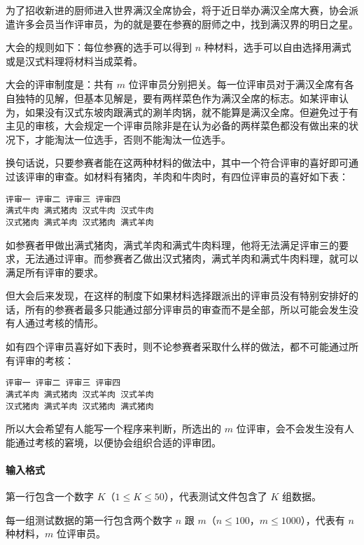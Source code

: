 \documentclass[]{article}
\let\oldparagraph\paragraph
\renewcommand{\paragraph}[1]{\oldparagraph{#1}\mbox{}}
\begin{document}
为了招收新进的厨师进入世界满汉全席协会，将于近日举办满汉全席大赛，协会派遣许多会员当作评审员，为的就是要在参赛的厨师之中，找到满汉界的明日之星。

大会的规则如下：每位参赛的选手可以得到 \(n\)
种材料，选手可以自由选择用满式或是汉式料理将材料当成菜肴。

大会的评审制度是：共有 \(m\)
位评审员分别把关。每一位评审员对于满汉全席有各自独特的见解，但基本见解是，要有两样菜色作为满汉全席的标志。如某评审认为，如果没有汉式东坡肉跟满式的涮羊肉锅，就不能算是满汉全席。但避免过于有主见的审核，大会规定一个评审员除非是在认为必备的两样菜色都没有做出来的状况下，才能淘汰一位选手，否则不能淘汰一位选手。

换句话说，只要参赛者能在这两种材料的做法中，其中一个符合评审的喜好即可通过该评审的审查。如材料有猪肉，羊肉和牛肉时，有四位评审员的喜好如下表：

\begin{verbatim}
评审一 评审二 评审三 评审四 
满式牛肉 满式猪肉 汉式牛肉 汉式牛肉 
汉式猪肉 满式羊肉 汉式猪肉 满式羊肉 
\end{verbatim}

如参赛者甲做出满式猪肉，满式羊肉和满式牛肉料理，他将无法满足评审三的要求，无法通过评审。而参赛者乙做出汉式猪肉，满式羊肉和满式牛肉料理，就可以满足所有评审的要求。

但大会后来发现，在这样的制度下如果材料选择跟派出的评审员没有特别安排好的话，所有的参赛者最多只能通过部分评审员的审查而不是全部，所以可能会发生没有人通过考核的情形。

如有四个评审员喜好如下表时，则不论参赛者采取什么样的做法，都不可能通过所有评审的考核：

\begin{verbatim}
评审一 评审二 评审三 评审四 
满式羊肉 满式猪肉 汉式羊肉 汉式羊肉 
汉式猪肉 满式羊肉 汉式猪肉 满式猪肉 
\end{verbatim}

所以大会希望有人能写一个程序来判断，所选出的 \(m\)
位评审，会不会发生没有人能通过考核的窘境，以便协会组织合适的评审团。

\hypertarget{ux8f93ux5165ux683cux5f0f-2}{%
\paragraph{输入格式}\label{ux8f93ux5165ux683cux5f0f-2}}

第一行包含一个数字 \(K\)（\(1\le K \le 50\)），代表测试文件包含了 \(K\)
组数据。

每一组测试数据的第一行包含两个数字 \(n\) 跟
\(m\)（\(n≤100\)，\(m≤1000\)），代表有 \(n\) 种材料，\(m\) 位评审员。
\end{document}
